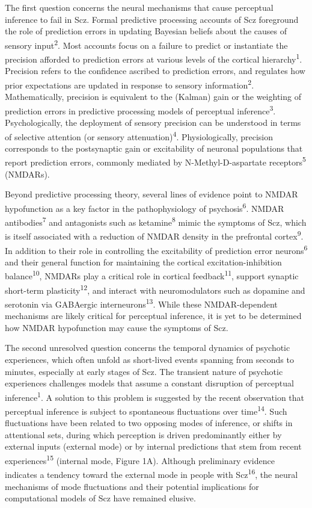 \documentclass[
]{article}
\begin{document}
The first question concerns the neural mechanisms that cause perceptual
inference to fail in Scz. Formal predictive processing accounts of Scz
foreground the role of prediction errors in updating Bayesian beliefs
about the causes of sensory input\textsuperscript{2}. Most accounts
focus on a failure to predict or instantiate the precision afforded to
prediction errors at various levels of the cortical
hierarchy\textsuperscript{1}. Precision refers to the confidence
ascribed to prediction errors, and regulates how prior expectations are
updated in response to sensory information\textsuperscript{2}.
Mathematically, precision is equivalent to the (Kalman) gain or the
weighting of prediction errors in predictive processing models of
perceptual inference\textsuperscript{3}. Psychologically, the deployment
of sensory precision can be understood in terms of selective attention
(or sensory attenuation)\textsuperscript{4}. Physiologically, precision
corresponds to the postsynaptic gain or excitability of neuronal
populations that report prediction errors, commonly mediated by
N-Methyl-D-aspartate receptors\textsuperscript{5} (NMDARs).

Beyond predictive processing theory, several lines of evidence point to
NMDAR hypofunction as a key factor in the pathophysiology of
psychosis\textsuperscript{6}. NMDAR antibodies\textsuperscript{7} and
antagonists such as ketamine\textsuperscript{8} mimic the symptoms of
Scz, which is itself associated with a reduction of NMDAR density in the
prefrontal cortex\textsuperscript{9}. In addition to their role in
controlling the excitability of prediction error
neurons\textsuperscript{6} and their general function for maintaining
the cortical excitation-inhibition balance\textsuperscript{10}, NMDARs
play a critical role in cortical feedback\textsuperscript{11}, support
synaptic short-term plasticity\textsuperscript{12}, and interact with
neuromodulators such as dopamine and serotonin via GABAergic
interneurons\textsuperscript{13}. While these NMDAR-dependent mechanisms
are likely critical for perceptual inference, it is yet to be determined
how NMDAR hypofunction may cause the symptoms of Scz.

The second unresolved question concerns the temporal dynamics of
psychotic experiences, which often unfold as short-lived events spanning
from seconds to minutes, especially at early stages of Scz. The
transient nature of psychotic experiences challenges models that assume
a constant disruption of perceptual inference\textsuperscript{1}. A
solution to this problem is suggested by the recent observation that
perceptual inference is subject to spontaneous fluctuations over
time\textsuperscript{14}. Such fluctuations have been related to two
opposing modes of inference, or shifts in attentional sets, during which
perception is driven predominantly either by external inputs (external
mode) or by internal predictions that stem from recent
experiences\textsuperscript{15} (internal mode, Figure 1A). Although
preliminary evidence indicates a tendency toward the external mode in
people with Scz\textsuperscript{16}, the neural mechanisms of mode
fluctuations and their potential implications for computational models
of Scz have remained elusive.
\end{document}
